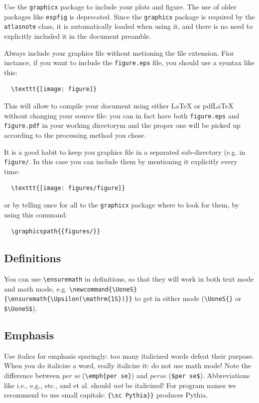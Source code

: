 \documentclass[11pt,a4paper]{atlasnote}
\begin{document}
Use the {\tt graphicx} package \cite{} to include your plots and
figure. The use of older packages like {\tt espfig} is deprecated.
Since the {\tt graphicx} package is required by the {\tt atlasnote}
class, it is automatically loaded when using it, and there is no need
to explicitly included it in the document preamble.

Always include your graphics file without metioning the file
extension. Fior inctance, if you want to include the {\tt figure.eps}
file, you should use a sysntax like this:
\begin{verbatim}
  \texttt{[image: figure]}
\end{verbatim}
This will allow to compile your document using either \LaTeX{} or
pdf\LaTeX{} without changing your source file: you can in fact have
both {\tt figure.eps} and {\tt figure.pdf} in your working directorym
and the proper one will be picked up according to the processing method
you chose.

It is a good habit to keep you graphics file in a separated
sub-directory (e.g. in {\tt figure/}. In this case you can include them
by mentioning it explicitly every time:
\begin{verbatim}
  \texttt{[image: figures/figure]}
\end{verbatim}
or by telling once for all to the {\tt graphicx} package where to look
for them, by using this command:
\begin{verbatim}
  \graphicspath{{figures/}}
\end{verbatim}


\subsection{Definitions}

You can use \verb|\ensuremath| in definitions, so that they will work
in both text mode and math mode, e.g.
\verb|\newcommand{\UoneS}{\ensuremath{\Upsilon(\mathrm{1S})}}| to get
\UoneS{} in either mode (\verb|\UoneS{}| or \verb|$\UoneS$|).

\subsection{Emphasis}

Use italics for emphasis sparingly: too many italicized words defeat
their purpose. When you do italicize a word, really italicize it: do
not use math mode! Note the difference between \emph{per se}
(\verb|\emph{per se}|) and $per se$ (\verb+$per se$+). Abbreviations
like i.e., e.g., etc., and et al. should \emph{not} be italicized!
For program names we recommend to use small capitals:
\verb|{\sc Pythia}}| produces {\sc Pythia}.
\end{document}
